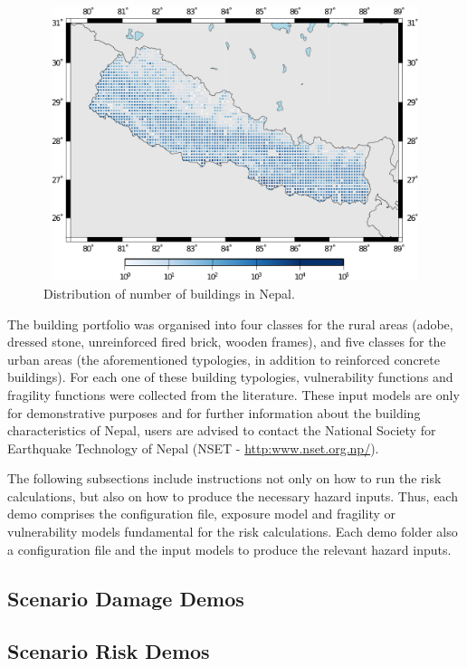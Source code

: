 \begin{figure}[ht]
\centering
\includegraphics[width=12cm,height=8cm]{figures/risk/exposure-nepal.pdf}
\caption{Distribution of number of buildings in Nepal.}
\label{fig:exposure-nepal}
\end{figure}

The building portfolio was organised into four classes for the rural areas
(adobe, dressed stone, unreinforced fired brick, wooden frames), and five
classes for the urban areas (the aforementioned typologies, in addition to
reinforced concrete buildings). For each one of these building typologies,
\glspl{vulnerability function} and \glspl{fragility function} were collected
from the literature. These input models are only for demonstrative purposes
and for further information about the building characteristics of Nepal, users
are advised to contact the National Society for Earthquake Technology of Nepal
(NSET - \href{http://www.nset.org.np/}{http:www.nset.org.np/}).

The following subsections include instructions not only on how to run the risk
calculations, but also on how to produce the necessary hazard inputs. Thus,
each demo comprises the configuration file, exposure model and fragility or
vulnerability models fundamental for the risk calculations. Each demo folder
also a configuration file and the input models to produce the relevant hazard
inputs.


\subsection{Scenario Damage Demos}
\label{subsec:demos_scenario_damage}


\subsection{Scenario Risk Demos}
\label{subsec:demos_scenario_risk}


